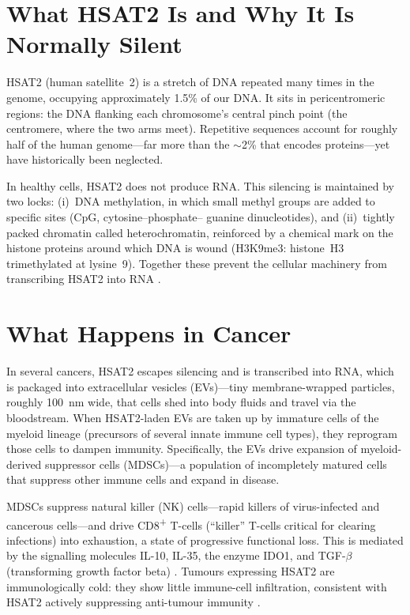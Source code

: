 \documentclass[11pt,a4paper]{scrartcl}
\begin{document}
\section{What HSAT2 Is and Why It Is Normally Silent}

HSAT2 (human satellite~2) is a stretch of DNA repeated many times
in the genome, occupying approximately 1.5\% of our DNA.  It
sits in pericentromeric regions: the DNA flanking each
chromosome's central pinch point (the centromere, where the two
arms meet).  Repetitive sequences account for roughly half of
the human genome---far more than the $\sim$2\% that encodes
proteins---yet have historically been neglected.

In healthy cells, HSAT2 does not produce RNA.  This silencing is
maintained by two locks: (i)~DNA methylation, in which small methyl
groups are added to specific sites (CpG, cytosine--phosphate--%
guanine dinucleotides), and (ii)~tightly packed chromatin called
heterochromatin, reinforced by a chemical mark on the histone proteins around which DNA is
wound (H3K9me3: histone~H3 trimethylated at lysine~9).  Together these prevent the cellular
machinery from transcribing HSAT2 into RNA
\cite{Shadle2019HSATII,Gerard2023CTCFpreprint}.

\section{What Happens in Cancer}

In several cancers, HSAT2 escapes silencing and is transcribed
into RNA, which is packaged into extracellular vesicles
(EVs)---tiny membrane-wrapped particles, roughly 100~nm wide, that
cells shed into body fluids and travel via the bloodstream.
When HSAT2-laden EVs are taken up by immature cells of the myeloid
lineage (precursors of several innate immune cell types), they
reprogram those cells to dampen immunity.  Specifically, the EVs
drive expansion of myeloid-derived suppressor cells (MDSCs)---a
population of incompletely matured cells that suppress other
immune cells and expand in disease.

MDSCs suppress natural killer (NK) cells---rapid killers of
virus-infected and cancerous cells---and drive
CD8\textsuperscript{+} T-cells (``killer'' T-cells critical
for clearing infections) into exhaustion, a state of progressive
functional loss.  This is mediated by the
signalling molecules IL-10, IL-35, the enzyme IDO1, and TGF-$\beta$
(transforming growth factor beta)
\cite{Ruzanov2024ETSsatelliteEV}.  Tumours expressing HSAT2 are
immunologically cold: they show little immune-cell infiltration,
consistent with HSAT2 actively suppressing anti-tumour immunity
\cite{Ninomiya2023CAST}.
\end{document}
